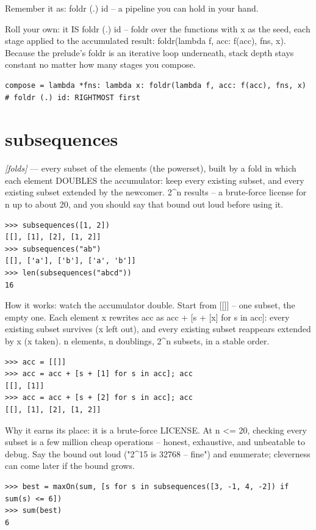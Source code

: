 \documentclass[11pt,letterpaper]{book}
\begin{document}
Remember it as: foldr (.) id -- a pipeline you can hold in your hand.


Roll your own: it IS foldr (.) id -- foldr over the functions with x as the seed, each stage applied to the accumulated result: foldr(lambda f, acc: f(acc), fns, x). Because the prelude's foldr is an iterative loop underneath, stack depth stays constant no matter how many stages you compose.

\begin{lstlisting}[style=code]
compose = lambda *fns: lambda x: foldr(lambda f, acc: f(acc), fns, x)  # foldr (.) id: RIGHTMOST first
\end{lstlisting}

\section{subsequences}
\noindent\textit{[folds]} --- every subset of the elements (the powerset), built by a fold in which each element DOUBLES the accumulator: keep every existing subset, and every existing subset extended by the newcomer. 2\^{}n results -- a brute-force license for n up to about 20, and you should say that bound out loud before using it.
\begin{lstlisting}[style=spec]
>>> subsequences([1, 2])
[[], [1], [2], [1, 2]]
>>> subsequences("ab")
[[], ['a'], ['b'], ['a', 'b']]
>>> len(subsequences("abcd"))
16
\end{lstlisting}

How it works: watch the accumulator double. Start from [[]] -- one subset, the empty one. Each element x rewrites acc as acc + [s + [x] for s in acc]: every existing subset survives (x left out), and every existing subset reappears extended by x (x taken). n elements, n doublings, 2\^{}n subsets, in a stable order.

\begin{lstlisting}[style=spec]
>>> acc = [[]]
>>> acc = acc + [s + [1] for s in acc]; acc
[[], [1]]
>>> acc = acc + [s + [2] for s in acc]; acc
[[], [1], [2], [1, 2]]
\end{lstlisting}

Why it earns its place: it is a brute-force LICENSE. At n <= 20, checking every subset is a few million cheap operations -- honest, exhaustive, and unbeatable to debug. Say the bound out loud ("2\^{}15 is 32768 -- fine") and enumerate; cleverness can come later if the bound grows.

\begin{lstlisting}[style=spec]
>>> best = maxOn(sum, [s for s in subsequences([3, -1, 4, -2]) if sum(s) <= 6])
>>> sum(best)
6
\end{lstlisting}
\end{document}
